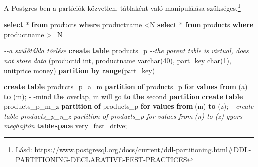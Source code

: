 \documentclass[
  magyar,
]{article}
\newenvironment{Shaded}{}{}
\newcommand{\CommentTok}[1]{\textcolor[rgb]{0.38,0.63,0.69}{\textit{#1}}}
\newcommand{\ControlFlowTok}[1]{\textcolor[rgb]{0.00,0.44,0.13}{\textbf{#1}}}
\newcommand{\DataTypeTok}[1]{\textcolor[rgb]{0.56,0.13,0.00}{#1}}
\newcommand{\DecValTok}[1]{\textcolor[rgb]{0.25,0.63,0.44}{#1}}
\newcommand{\KeywordTok}[1]{\textcolor[rgb]{0.00,0.44,0.13}{\textbf{#1}}}
\newcommand{\NormalTok}[1]{#1}
\newcommand{\OperatorTok}[1]{\textcolor[rgb]{0.40,0.40,0.40}{#1}}
\newcommand{\StringTok}[1]{\textcolor[rgb]{0.25,0.44,0.63}{#1}}
\begin{document}
A Postgres-ben a partíciók közvetlen, táblaként való manipulálása
szükséges.\footnote{Lásd:
  https://www.postgresql.org/docs/current/ddl-partitioning.html\#DDL-PARTITIONING-DECLARATIVE-BEST-PRACTICES}

\begin{Shaded}
\begin{Highlighting}[]
\KeywordTok{select} \OperatorTok{*} \KeywordTok{from}\NormalTok{ products }\KeywordTok{where}\NormalTok{ productname }\OperatorTok{\textless{}}\StringTok{\textquotesingle{}N\textquotesingle{}}
\KeywordTok{select} \OperatorTok{*} \KeywordTok{from}\NormalTok{ products }\KeywordTok{where}\NormalTok{ productname }\OperatorTok{\textgreater{}=}\StringTok{\textquotesingle{}N\textquotesingle{}}

\CommentTok{{-}{-}a szülőtábla törlése}
\KeywordTok{create} \KeywordTok{table}\NormalTok{ products\_p }\CommentTok{{-}{-}the parent table is virtual, does not store data}
\NormalTok{   (productid }\DataTypeTok{int}\NormalTok{, productname }\DataTypeTok{varchar}\NormalTok{(}\DecValTok{40}\NormalTok{), part\_key }\DataTypeTok{char}\NormalTok{(}\DecValTok{1}\NormalTok{), unitprice money)}
\KeywordTok{partition} \KeywordTok{by} \KeywordTok{range}\NormalTok{(part\_key)}

\KeywordTok{create} \KeywordTok{table}\NormalTok{ products\_p\_a\_m }\KeywordTok{partition} \KeywordTok{of}\NormalTok{ products\_p }\ControlFlowTok{for} \KeywordTok{values} \KeywordTok{from}\NormalTok{ (}\StringTok{\textquotesingle{}a\textquotesingle{}}\NormalTok{) }\KeywordTok{to}\NormalTok{ (}\StringTok{\textquotesingle{}m\textquotesingle{}}\NormalTok{);  }\OperatorTok{{-}}
\OperatorTok{{-}}\NormalTok{mind }\KeywordTok{the}\NormalTok{ overlap, }\StringTok{\textquotesingle{}m\textquotesingle{}}\NormalTok{ will go }\KeywordTok{to} \KeywordTok{the} \DataTypeTok{second} \KeywordTok{partition}
\KeywordTok{create} \KeywordTok{table}\NormalTok{ products\_p\_m\_z }\KeywordTok{partition} \KeywordTok{of}\NormalTok{ products\_p }\ControlFlowTok{for} \KeywordTok{values} \KeywordTok{from}\NormalTok{ (}\StringTok{\textquotesingle{}m\textquotesingle{}}\NormalTok{) }\KeywordTok{to}\NormalTok{ (}\StringTok{\textquotesingle{}z\textquotesingle{}}\NormalTok{);}
\CommentTok{{-}{-}create table products\_p\_n\_z partition of products\_p for values from (\textquotesingle{}n\textquotesingle{}) to (\textquotesingle{}z\textquotesingle{}) gyors meghajtón}
\KeywordTok{tablespace}\NormalTok{ very\_fast\_drive;}


\end{Highlighting}
\end{Shaded}
\end{document}
